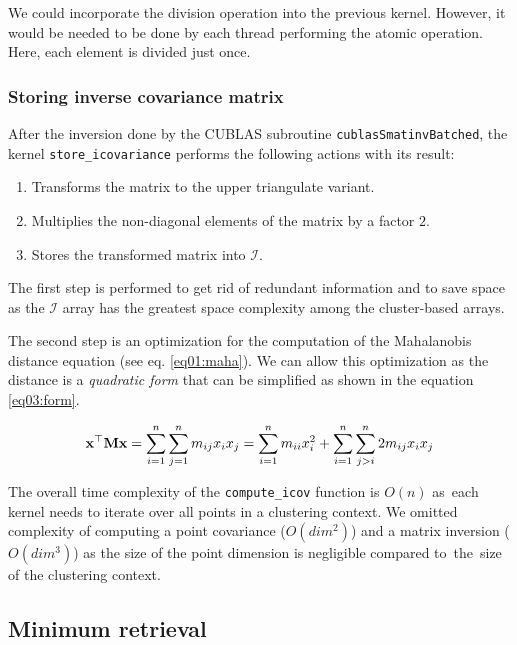 We could incorporate the division operation into the previous kernel. However, it would be needed to be done by each thread performing the atomic operation. Here, each element is divided just once.

\subsubsection{Storing inverse covariance matrix}
After the inversion done by the CUBLAS subroutine \texttt{cublasSmatinvBatched}, the kernel \texttt{store\_icovariance} performs the following actions with its result:
\begin{enumerate}
	\item Transforms the matrix to the upper triangulate variant.
	\item Multiplies the non-diagonal elements of the matrix by a factor $2$.
	\item Stores the transformed matrix into $\mathcal{I}$.
\end{enumerate}

The first step is performed to get rid of redundant information and to save space as the $\mathcal{I}$ array has the greatest space complexity among the cluster-based arrays.

The second step is an optimization for the computation of the Mahalanobis distance equation (see eq. \ref{eq01:maha}). We can allow this optimization as the distance is a \emph{quadratic form} that can be simplified as shown in the equation \ref{eq03:form}.

\begin{equation}
\mathbf{x}^\top\mathbf{M}\mathbf{x} = \sum_{i=1}^{n}\sum_{j=1}^{n}{m_{ij}x_ix_j} = \sum_{i=1}^{n}{m_{ii}x_i^2} + \sum_{i=1}^{n}\sum_{j>i}^{n}{2m_{ij}x_ix_j}
\label{eq03:form}
\end{equation}


\begin{rem}
The overall time complexity of the \texttt{compute\_icov} function is $O(n)$ as~each kernel needs to iterate over all points in a clustering context. We omitted complexity of computing a point covariance ($O(dim^2)$) and a matrix inversion ($O(dim^3)$) as the size of the point dimension is negligible compared to~the~size of the clustering context.
\end{rem}

\subsection{Minimum retrieval}

